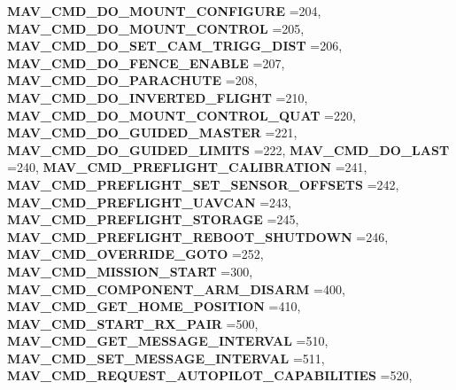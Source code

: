\begin{DoxyCompactItemize}
\textbf{ M\+A\+V\+\_\+\+C\+M\+D\+\_\+\+D\+O\+\_\+\+M\+O\+U\+N\+T\+\_\+\+C\+O\+N\+F\+I\+G\+U\+RE} =204, 
\textbf{ M\+A\+V\+\_\+\+C\+M\+D\+\_\+\+D\+O\+\_\+\+M\+O\+U\+N\+T\+\_\+\+C\+O\+N\+T\+R\+OL} =205, 
\newline
\textbf{ M\+A\+V\+\_\+\+C\+M\+D\+\_\+\+D\+O\+\_\+\+S\+E\+T\+\_\+\+C\+A\+M\+\_\+\+T\+R\+I\+G\+G\+\_\+\+D\+I\+ST} =206, 
\textbf{ M\+A\+V\+\_\+\+C\+M\+D\+\_\+\+D\+O\+\_\+\+F\+E\+N\+C\+E\+\_\+\+E\+N\+A\+B\+LE} =207, 
\textbf{ M\+A\+V\+\_\+\+C\+M\+D\+\_\+\+D\+O\+\_\+\+P\+A\+R\+A\+C\+H\+U\+TE} =208, 
\textbf{ M\+A\+V\+\_\+\+C\+M\+D\+\_\+\+D\+O\+\_\+\+I\+N\+V\+E\+R\+T\+E\+D\+\_\+\+F\+L\+I\+G\+HT} =210, 
\newline
\textbf{ M\+A\+V\+\_\+\+C\+M\+D\+\_\+\+D\+O\+\_\+\+M\+O\+U\+N\+T\+\_\+\+C\+O\+N\+T\+R\+O\+L\+\_\+\+Q\+U\+AT} =220, 
\textbf{ M\+A\+V\+\_\+\+C\+M\+D\+\_\+\+D\+O\+\_\+\+G\+U\+I\+D\+E\+D\+\_\+\+M\+A\+S\+T\+ER} =221, 
\textbf{ M\+A\+V\+\_\+\+C\+M\+D\+\_\+\+D\+O\+\_\+\+G\+U\+I\+D\+E\+D\+\_\+\+L\+I\+M\+I\+TS} =222, 
\textbf{ M\+A\+V\+\_\+\+C\+M\+D\+\_\+\+D\+O\+\_\+\+L\+A\+ST} =240, 
\newline
\textbf{ M\+A\+V\+\_\+\+C\+M\+D\+\_\+\+P\+R\+E\+F\+L\+I\+G\+H\+T\+\_\+\+C\+A\+L\+I\+B\+R\+A\+T\+I\+ON} =241, 
\textbf{ M\+A\+V\+\_\+\+C\+M\+D\+\_\+\+P\+R\+E\+F\+L\+I\+G\+H\+T\+\_\+\+S\+E\+T\+\_\+\+S\+E\+N\+S\+O\+R\+\_\+\+O\+F\+F\+S\+E\+TS} =242, 
\textbf{ M\+A\+V\+\_\+\+C\+M\+D\+\_\+\+P\+R\+E\+F\+L\+I\+G\+H\+T\+\_\+\+U\+A\+V\+C\+AN} =243, 
\textbf{ M\+A\+V\+\_\+\+C\+M\+D\+\_\+\+P\+R\+E\+F\+L\+I\+G\+H\+T\+\_\+\+S\+T\+O\+R\+A\+GE} =245, 
\newline
\textbf{ M\+A\+V\+\_\+\+C\+M\+D\+\_\+\+P\+R\+E\+F\+L\+I\+G\+H\+T\+\_\+\+R\+E\+B\+O\+O\+T\+\_\+\+S\+H\+U\+T\+D\+O\+WN} =246, 
\textbf{ M\+A\+V\+\_\+\+C\+M\+D\+\_\+\+O\+V\+E\+R\+R\+I\+D\+E\+\_\+\+G\+O\+TO} =252, 
\textbf{ M\+A\+V\+\_\+\+C\+M\+D\+\_\+\+M\+I\+S\+S\+I\+O\+N\+\_\+\+S\+T\+A\+RT} =300, 
\textbf{ M\+A\+V\+\_\+\+C\+M\+D\+\_\+\+C\+O\+M\+P\+O\+N\+E\+N\+T\+\_\+\+A\+R\+M\+\_\+\+D\+I\+S\+A\+RM} =400, 
\newline
\textbf{ M\+A\+V\+\_\+\+C\+M\+D\+\_\+\+G\+E\+T\+\_\+\+H\+O\+M\+E\+\_\+\+P\+O\+S\+I\+T\+I\+ON} =410, 
\textbf{ M\+A\+V\+\_\+\+C\+M\+D\+\_\+\+S\+T\+A\+R\+T\+\_\+\+R\+X\+\_\+\+P\+A\+IR} =500, 
\textbf{ M\+A\+V\+\_\+\+C\+M\+D\+\_\+\+G\+E\+T\+\_\+\+M\+E\+S\+S\+A\+G\+E\+\_\+\+I\+N\+T\+E\+R\+V\+AL} =510, 
\textbf{ M\+A\+V\+\_\+\+C\+M\+D\+\_\+\+S\+E\+T\+\_\+\+M\+E\+S\+S\+A\+G\+E\+\_\+\+I\+N\+T\+E\+R\+V\+AL} =511, 
\newline
\textbf{ M\+A\+V\+\_\+\+C\+M\+D\+\_\+\+R\+E\+Q\+U\+E\+S\+T\+\_\+\+A\+U\+T\+O\+P\+I\+L\+O\+T\+\_\+\+C\+A\+P\+A\+B\+I\+L\+I\+T\+I\+ES} =520, 

\end{DoxyCompactItemize}
